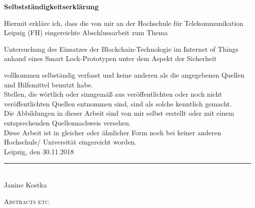 \documentclass[toc=sectionentrywithdots,a4paper,12pt,oneside]{scrartcl}
\newcommand{\thema}{Untersuchung des Einsatzes der Blockchain-Technologie im Internet of Things anhand eines Smart Lock-Prototypen unter dem Aspekt der Sicherheit}
\newcommand{\name}{Janine Kostka}
\newcommand{\abgabe}{30.11.2018}
\begin{document}
	\newpage
	\thispagestyle{empty}
	\vspace*{3em}
	\begin{center}
		\LARGE \textbf{Selbstständigkeitserklärung}
	\end{center}
	\normalsize
	\vspace*{3em}
	Hiermit erkläre ich, dass die von mir an der Hochschule für Telekommunikation Leipzig (FH)
	eingereichte Abschlussarbeit zum Thema
	\vspace*{1em}
	\begin{center}
		\thema
	\end{center}
	\vspace*{1em}
	vollkommen selbständig verfasst und keine anderen als die angegebenen Quellen und
	Hilfsmittel benutzt habe.
	\\[2em]
	Stellen, die wörtlich oder sinngemäß aus veröffentlichten oder noch nicht veröffentlichten
	Quellen entnommen sind, sind als solche kenntlich gemacht.
	\\[2em]
	Die Abbildungen in dieser Arbeit sind von mir selbst erstellt oder mit einem entsprechenden
	Quellennachweis versehen.
	\\[2em]
	Diese Arbeit ist in gleicher oder ähnlicher Form noch bei keiner anderen Hochschule/
	Universität eingereicht worden.
	\\[6em]
	
	Leipzig, den \abgabe \tab \rule{6cm}{0.5pt}\\
	\hspace*{22em}\name
	\newpage
	
	\thispagestyle{empty}
	
	\textsc{{\LARGE Abstracts etc.}}
	
	\newpage
	
	\normalsize
	\tableofcontents
	\newpage
	\listoffigures
	\newpage
	\listoftables
	\newpage
	\printglossary[type=\acronymtype]
	\thispagestyle{empty}
	\newpage
	
\end{document}
